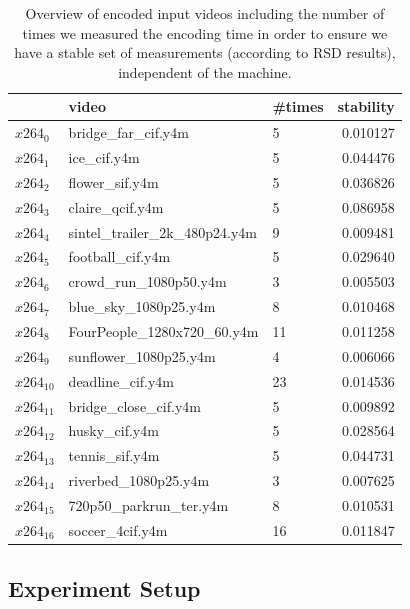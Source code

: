 \begin{table}
\begin{tabular}{lllr}
\toprule
{} &                         video & \#times &  stability \\
\midrule
$x264_0$ &            bridge\_far\_cif.y4m &      5 &     0.010127 \\ 
$x264_1$ &                   ice\_cif.y4m &      5 &     0.044476 \\ 
$x264_2$ &                flower\_sif.y4m &      5 &     0.036826 \\ 
$x264_3$ &               claire\_qcif.y4m &      5 &     0.086958 \\ 
$x264_4$ &  sintel\_trailer\_2k\_480p24.y4m &      9 &     0.009481 \\ 
$x264_5$ &              football\_cif.y4m &      5 &     0.029640 \\ 
$x264_6$ &         crowd\_run\_1080p50.y4m &      3 &     0.005503 \\ 
$x264_7$ &          blue\_sky\_1080p25.y4m &      8 &     0.010468 \\ 
$x264_8$ &    FourPeople\_1280x720\_60.y4m &     11 &     0.011258 \\ 
$x264_9$ &         sunflower\_1080p25.y4m &      4 &     0.006066 \\ 
$x264_{10}$ &              deadline\_cif.y4m &     23 &     0.014536 \\ 
$x264_{11}$ &          bridge\_close\_cif.y4m &      5 &     0.009892 \\ 
$x264_{12}$ &                 husky\_cif.y4m &      5 &     0.028564 \\ 
$x264_{13}$ &                tennis\_sif.y4m &      5 &     0.044731 \\ 
$x264_{14}$ &          riverbed\_1080p25.y4m &      3 &     0.007625 \\ 
$x264_{15}$ &        720p50\_parkrun\_ter.y4m &      8 &     0.010531 \\ 
$x264_{16}$ &               soccer\_4cif.y4m &     16 &     0.011847 \\ 
\bottomrule
\end{tabular}
\caption{Overview of encoded input videos including the number of times we measured the encoding time in order to ensure we have a stable set of measurements (according to RSD results), independent of the machine.}
\vspace*{-4mm}
\label{tab:input_videos}
\end{table}

\subsection{Experiment Setup} \label{sec:experiment}

